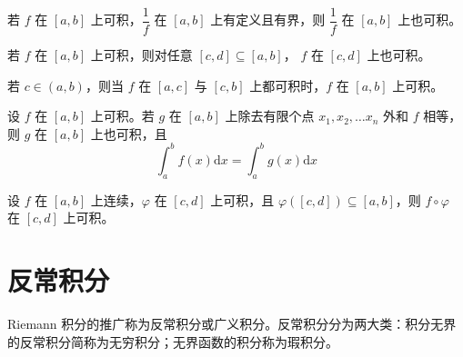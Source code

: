 \begin{corollary}
    若 $f$ 在 $[a, b]$ 上可积，$\dfrac{1}{f}$ 在 $[a, b]$ 上有定义且有界，则 $\dfrac{1}{f}$ 在 $[a, b]$ 上也可积。
\end{corollary}

\begin{corollary}
    若 $f$ 在 $[a, b]$ 上可积，则对任意 $[c,d] \subseteq [a, b]$， $f$ 在 $[c,d]$ 上也可积。
\end{corollary}

\begin{corollary}
    若 $c \in (a, b)$，则当 $f$ 在 $[a,c]$ 与 $[c, b]$ 上都可积时，$f$ 在 $[a, b]$ 上可积。
\end{corollary}

\begin{corollary}
    设 $f$ 在 $[a, b]$ 上可积。若 $g$ 在 $[a, b]$ 上除去有限个点 $x_1,x_2, \ldots x_n$ 外和 $f$ 相等，则 $g$ 在 $[a, b]$ 上也可积，且
    \[\int_{a}^{b}f(x)\mathrm{d}x = \int_{a}^{b}g(x)\mathrm{d}x\]
\end{corollary}

\begin{corollary}
    设 $f$ 在 $[a, b]$ 上连续，$\varphi$ 在 $[c,d]$ 上可积，且 $\varphi([c,d]) \subseteq [a, b]$，则 $f\circ\varphi$ 在 $[c,d]$ 上可积。
\end{corollary}


\section{反常积分}

Riemann 积分的推广称为反常积分或广义积分。反常积分分为两大类：积分无界的反常积分简称为无穷积分；无界函数的积分称为瑕积分。

